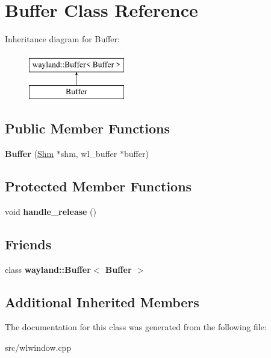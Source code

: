 \hypertarget{classBuffer}{}\section{Buffer Class Reference}
\label{classBuffer}
Inheritance diagram for Buffer\+:\begin{figure}[H]
\begin{center}
\leavevmode
\includegraphics[height=2.000000cm]{classBuffer}
\end{center}
\end{figure}
\subsection*{Public Member Functions}
\begin{DoxyCompactItemize}
\item 
\mbox{\label{classBuffer_ac5baf7fb6ff05dda079645f38f800692}} 
{\bfseries Buffer} (\mbox{\hyperlink{classShm}{Shm}} $\ast$shm, wl\+\_\+buffer $\ast$buffer)
\end{DoxyCompactItemize}
\subsection*{Protected Member Functions}
\begin{DoxyCompactItemize}
\item 
\mbox{\label{classBuffer_adba53258e523719c3bececa5057f2c37}} 
void {\bfseries handle\+\_\+release} ()
\end{DoxyCompactItemize}
\subsection*{Friends}
\begin{DoxyCompactItemize}
\item 
\mbox{\label{classBuffer_adbfed73b7d4071ea59a8cf42ccb8fecd}} 
class {\bfseries wayland\+::\+Buffer$<$ Buffer $>$}
\end{DoxyCompactItemize}
\subsection*{Additional Inherited Members}


The documentation for this class was generated from the following file\+:\begin{DoxyCompactItemize}
\item 
src/wlwindow.\+cpp\end{DoxyCompactItemize}
